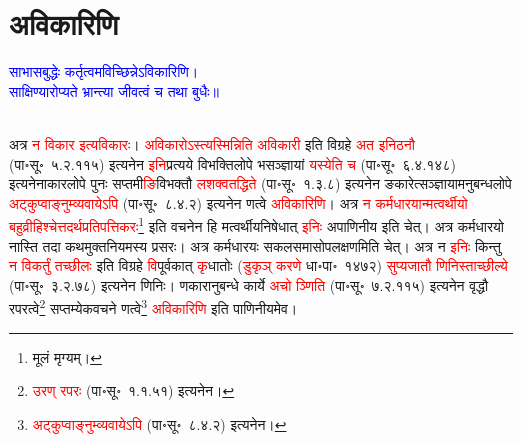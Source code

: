 \section[अविकारिणि]{अविकारिणि}
\centering\textcolor{blue}{साभासबुद्धेः कर्तृत्वमविच्छिन्नेऽविकारिणि।\nopagebreak\\
साक्षिण्यारोप्यते भ्रान्त्या जीवत्वं च तथा बुधैः॥}\nopagebreak\\
\\
\begin{sloppypar}\justifying\noindent\hspace{10mm} अत्र \textcolor{red}{न विकार इत्यविकारः}। \textcolor{red}{अविकारोऽस्त्यस्मिन्निति अविकारी} इति विग्रहे \textcolor{red}{अत इनिठनौ} (पा॰सू॰~५.२.११५) इत्यनेन \textcolor{red}{इनि}\-प्रत्यये विभक्ति\-लोपे भ\-सञ्ज्ञायां \textcolor{red}{यस्येति च} (पा॰सू॰~६.४.१४८) इत्यनेनाकार\-लोपे पुनः सप्तमी\-\textcolor{red}{ङि}\-विभक्तौ \textcolor{red}{लशक्वतद्धिते} (पा॰सू॰~१.३.८) इत्यनेन ङकारेत्सञ्ज्ञायामनुबन्ध\-लोपे \textcolor{red}{अट्कुप्वाङ्नुम्व्यवायेऽपि} (पा॰सू॰~८.४.२) इत्यनेन णत्वे \textcolor{red}{अविकारिणि}। अत्र \textcolor{red}{न कर्मधारयान्मत्वर्थीयो बहुव्रीहिश्चेत्तदर्थ\-प्रतिपत्ति\-करः}\footnote{मूलं मृग्यम्।} इति वचनेन हि मत्वर्थीय\-निषेधात् \textcolor{red}{इनिः} अपाणिनीय इति चेत्। अत्र कर्मधारयो नास्ति तदा कथमुक्त\-नियमस्य प्रसरः। अत्र कर्मधारयः सकल\-समासोपलक्षणमिति चेत्। अत्र न \textcolor{red}{इनिः} किन्तु \textcolor{red}{न विकर्तुं तच्छीलः} इति विग्रहे \textcolor{red}{वि}\-पूर्वकात् \textcolor{red}{कृ}\-धातोः (\textcolor{red}{डुकृञ् करणे} धा॰पा॰~१४७२) \textcolor{red}{सुप्यजातौ णिनिस्ताच्छील्ये} (पा॰सू॰~३.२.७८) इत्यनेन णिनिः। णकारानुबन्धे कार्ये \textcolor{red}{अचो ञ्णिति} (पा॰सू॰~७.२.११५) इत्यनेन वृद्धौ रपरत्वे\footnote{\textcolor{red}{उरण् रपरः} (पा॰सू॰~१.१.५१) इत्यनेन।} सप्तम्येकवचने णत्वे\footnote{\textcolor{red}{अट्कुप्वाङ्नुम्व्यवायेऽपि} (पा॰सू॰~८.४.२) इत्यनेन।} \textcolor{red}{अविकारिणि} इति पाणिनीयमेव।\end{sloppypar}
